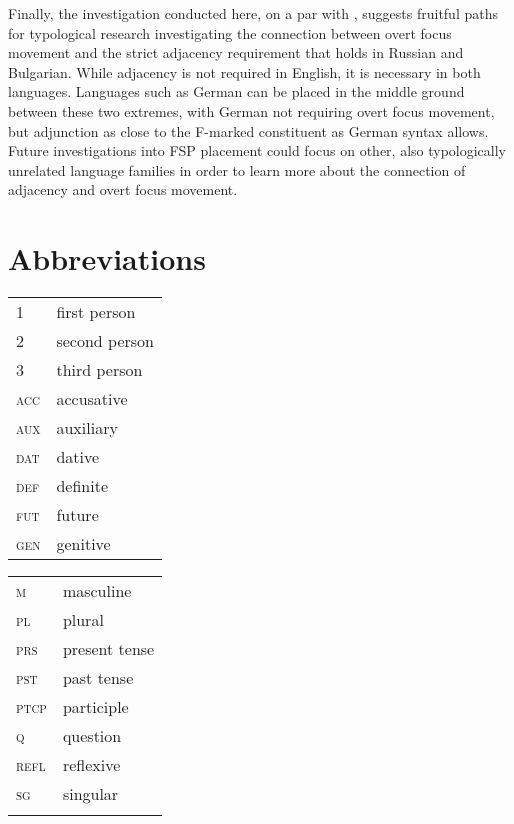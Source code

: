 \documentclass[output=paper,colorlinks,citecolor=brown]{langscibook}
\begin{document}
Finally, the investigation conducted here, on a par with \citet{Zanon2018}, suggests fruitful paths for typological research investigating the connection between overt focus movement and the strict adjacency requirement that holds in Russian and Bulgarian. While adjacency is not required in English, it is necessary in both languages. Languages such as German can be placed in the middle ground between these two extremes, with German not requiring overt focus movement, but adjunction as close to the F-marked constituent as German syntax allows. Future investigations into FSP placement could focus on other, also typologically unrelated language families in order to learn more about the connection of adjacency and overt focus movement. 

\section*{Abbreviations}

\begin{tabularx}{.5\textwidth}{@{}lQ}
\textsc{1}&first person\\
\textsc{2}&second person\\
\textsc{3}&third person\\
\textsc{acc}&accusative\\
\textsc{aux}&auxiliary\\
\textsc{dat}&dative\\
\textsc{def}&definite\\
\textsc{fut}&future\\
\textsc{gen}&genitive\\
\end{tabularx}%
\begin{tabularx}{.5\textwidth}{lQ@{}}
\textsc{m}&masculine\\
\textsc{pl}&plural\\
\textsc{prs}&present tense\\
\textsc{pst}&past tense\\
\textsc{ptcp}&participle\\
\textsc{q}&question\\
\textsc{refl}&reflexive\\
\textsc{sg}&singular\\
&\\ %
\end{tabularx}
\end{document}
